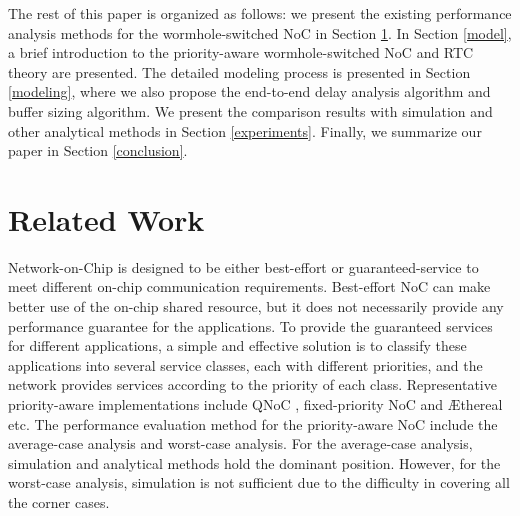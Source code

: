 \documentclass[preprint]{elsarticle}
\begin{document}
The rest of this paper is organized as follows: we present the existing performance analysis methods for the wormhole-switched NoC in Section \ref{related}. In Section \ref{model}, a brief introduction to the priority-aware wormhole-switched NoC and RTC theory are presented. The detailed modeling process is presented in Section \ref{modeling}, where we also propose the end-to-end delay analysis algorithm and buffer sizing algorithm. We present the comparison results with simulation and other analytical methods in Section \ref{experiments}. Finally, we summarize our paper in Section \ref{conclusion}.

\section{Related Work}\label{related}
Network-on-Chip is designed to be either best-effort or guaranteed-service to meet different on-chip communication requirements. Best-effort NoC can make better use of the on-chip shared resource, but it does not necessarily provide any performance guarantee for the applications. To provide the guaranteed services for different applications, a simple and effective solution is to classify these applications into several service classes, each with different priorities, and the network provides services according to the priority of each class. Representative priority-aware implementations include QNoC \cite{BCGK04}, fixed-priority NoC \cite{Shi:2008:RCA:1397757.1397996} and {{\AE}thereal} \cite{GoDR05} etc. The performance evaluation method for the priority-aware NoC include the average-case analysis and worst-case analysis. For the average-case analysis, simulation and analytical methods hold the dominant position. However, for the worst-case analysis, simulation is not sufficient due to the difficulty in covering all the corner cases.
\end{document}
